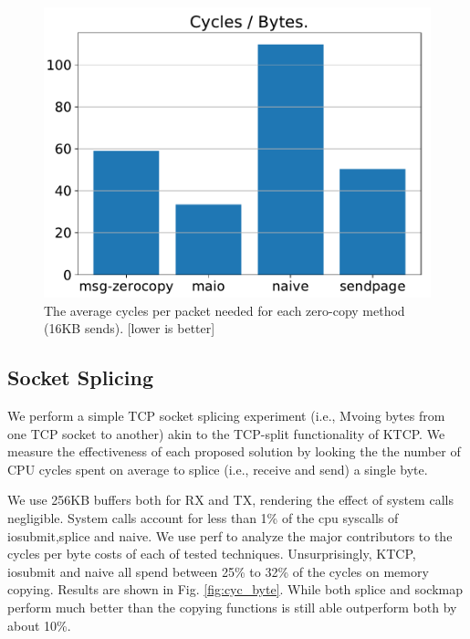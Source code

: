 \begin{figure}[t]
    \centering
    \includegraphics[width=\columnwidth]{send.pdf}
    \caption{The average cycles per packet needed for each zero-copy method (16KB sends). [lower is better]}
    \label{fig:tx_compare}
\end{figure}
\subsection{Socket Splicing}
We perform a simple TCP socket splicing experiment (i.e., Mvoing bytes from one TCP socket to another) akin to the TCP-split functionality of KTCP. We measure the effectiveness of each proposed solution by looking the the number of CPU cycles spent on average to splice (i.e., receive and send) a single byte.

We use 256KB buffers both for RX and TX, rendering the effect of system calls negligible. System calls account for less than 1\% of the cpu syscalls of iosubmit,splice and naive. We use perf\cite{perf} to analyze the major contributors to the cycles per byte costs of each of tested techniques. Unsurprisingly, KTCP, iosubmit and naive all spend between 25\% to 32\% of the cycles on memory copying. Results are shown in Fig. \ref{fig:cyc_byte}. While both splice and sockmap perform much better than the copying functions \oursys is still able outperform both by about 10\%.




